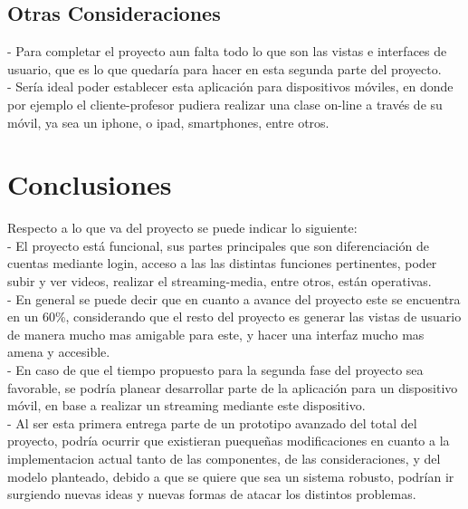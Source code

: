 \documentclass[12pt]{article}
\begin{document}
\subsection{Otras Consideraciones\\}
-	Para completar el proyecto aun falta todo lo que son las vistas e interfaces de usuario, que es lo que quedaría 
para hacer en esta segunda parte del proyecto.\\

-	Sería ideal poder establecer esta aplicación para dispositivos móviles, en donde por ejemplo el 
cliente-profesor pudiera realizar una clase on-line a través de su móvil, ya sea un iphone, o ipad, smartphones, entre otros.\\


\newpage
\section{Conclusiones\\}
Respecto a lo que va del proyecto se puede indicar lo siguiente:\\
-	El proyecto está funcional, sus partes principales que son diferenciación de cuentas 
mediante login, acceso a las las distintas funciones pertinentes, poder subir y ver videos, realizar
el streaming-media, entre otros, están operativas.\\

-	En general se puede decir que en cuanto a avance del proyecto este se encuentra en un 60\%, 
considerando que el resto del proyecto es generar las vistas de usuario de manera mucho mas amigable 
para este, y hacer una interfaz mucho mas amena y accesible.\\

-	En caso de que el tiempo propuesto para la segunda fase del proyecto sea favorable, se podría 
planear desarrollar parte de la aplicación para un dispositivo móvil, en base a realizar un streaming 
mediante este dispositivo.\\

-	Al ser esta primera entrega parte de un prototipo avanzado del total del proyecto, podría ocurrir
que existieran pueque\~nas modificaciones en cuanto a la implementacion actual tanto de las 
componentes, de las consideraciones, y del modelo planteado, debido a que se quiere que sea un
sistema robusto, podrían ir surgiendo nuevas ideas y nuevas formas de atacar los distintos problemas.\\
\end{document}
